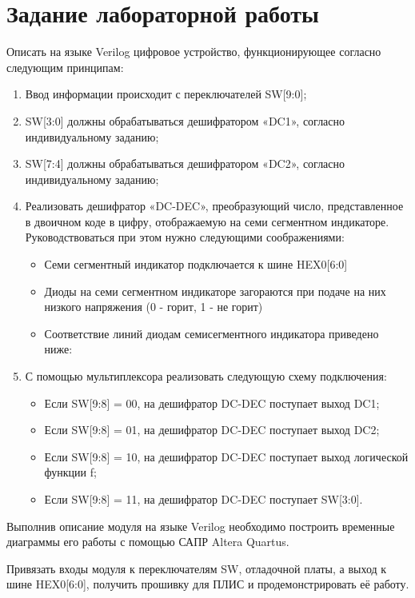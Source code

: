 \section{Задание лабораторной работы}
\par{Описать на языке Verilog цифровое устройство, функционирующее согласно следующим принципам:}
\begin{enumerate}
  \item Ввод информации происходит с переключателей SW[9:0];
  \item SW[3:0] должны обрабатываться дешифратором «DC1», согласно индивидуальному заданию;
  \item SW[7:4] должны обрабатываться дешифратором «DC2», согласно индивидуальному заданию;
  \item Реализовать дешифратор «DC-DEC», преобразующий число, представленное в двоичном коде в цифру, отображаемую на семи сегментном индикаторе. Руководствоваться при этом нужно следующими соображениями:
    \begin{itemize}
      \item Семи сегментный индикатор подключается к шине HEX0[6:0]
      \item Диоды на семи сегментном индикаторе загораются при подаче на них низкого напряжения (0 - горит, 1 - не горит)
      \item Соответствие линий диодам семисегментного индикатора приведено ниже:
        \begin{figure}[H]
          \centering
          \def\svgwidth{\columnwidth}
          
          \label{fig:decoder}
        \end{figure}
    \end{itemize}
    \item С помощью мультиплексора реализовать следующую схему подключения:
      \begin{itemize}
        \item Если SW[9:8] = 00, на дешифратор DC-DEC поступает выход DC1;
        \item Если SW[9:8] = 01, на дешифратор DC-DEC поступает выход DC2;
        \item Если SW[9:8] = 10, на дешифратор DC-DEC поступает выход логической функции f;
        \item Если SW[9:8] = 11, на дешифратор DC-DEC поступает SW[3:0].
      \end{itemize}
\end{enumerate}

\par{Выполнив описание модуля на языке Verilog необходимо построить временные диаграммы его работы с помощью САПР Altera Quartus.}
\par{Привязать входы модуля к переключателям SW, отладочной платы, а выход к шине HEX0[6:0], получить прошивку для ПЛИС и продемонстрировать её работу.}
